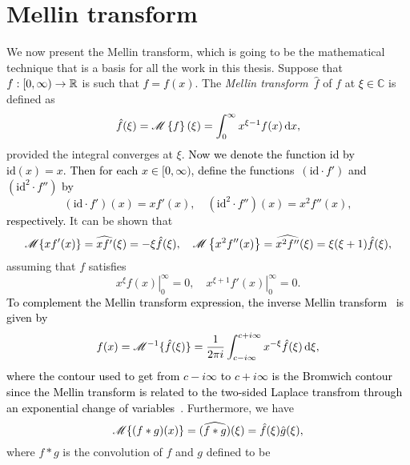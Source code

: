 \section{Mellin transform}
\label{subsec:mellin}
We now present the Mellin transform, which is going to be the mathematical technique that is a basis for all the work in this thesis. Suppose that $f : [0,\infty) \rightarrow \mathbb R$ is such that \textcolor{black}{$f = f(x)$}. The {\em Mellin transform}~$\hat f$ of $f$ at \textcolor{black}{$\xi \in \mathbb{C}$} is defined as
\begin{equation*}
\hat f(\xi) =  \textcolor{black}{\mathscr M\left\{ f \right\}(\xi)} = \int_0^\infty x^{\xi - 1} f(x) \, \mathrm d x,
\end{equation*}
provided the integral converges at $\xi$. \textcolor{black}{Now we denote the function id by $\text{id}(x) = x$. Then for each $x \in [0,\infty)$, define the functions~$(\text{id}\cdot f')$ and $(\text{id}^2 \cdot f'')$ by
\begin{equation*}
(\text{id}\cdot f')(x) = x f'(x), \quad (\text{id}^2\cdot f'')(x) = x^2 f''(x),
\end{equation*}
respectively.} It can be shown that \cite[pp. 362--363]{Myint1987}
\begin{equation}
\label{eqn:mellinDiv}
\mathscr M\{ xf'(x) \} = \widehat{x f'}(\xi) = -\xi \hat f(\xi), \quad \mathscr M\left\{ x^2f''(x) \right\} = \widehat{x^2 f''}(\xi) = \xi (\xi + 1) \hat f(\xi),
\end{equation}
assuming that $f$ satisfies
\begin{equation*}
\left. x^\xi f(x) \right\vert_0^\infty = 0, \quad \left. x^{\xi + 1} f'(x) \right\vert_0^\infty = 0.
\end{equation*}
\textcolor{black}{To complement the Mellin transform expression, the inverse Mellin transform~\cite{Titchmarsh1948} is given by
\begin{equation*}
	f(x) = \mathscr M^{-1}\{\hat f(\xi)\} = \frac{1}{2\pi i} \int_{c-i\infty}^{c+i\infty} x^{-\xi}\hat f(\xi)  \, \mathrm d \xi,
\end{equation*}
where the contour used to get from $c - i\infty$ to $c + i\infty$ is the Bromwich contour since the Mellin transform is related to the two-sided Laplace transfrom through an exponential change of variables~\cite{Bracewell2000}}. Furthermore, we have
	\begin{equation*}
		\mathscr M\{ (f \ast g)(x) \} = (\widehat{f \ast g})(\xi) = \hat f(\xi) \hat g(\xi),
	\end{equation*}
where $f \ast g$ is the convolution of $f$ and $g$ defined to be
